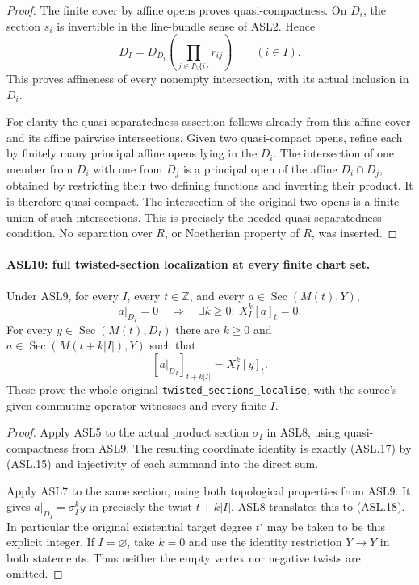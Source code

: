 \documentclass[11pt,a4paper]{article}
\numberwithin{equation}{section}
\theoremstyle{remark}\newtheorem{remark}[theorem]{Remark}
\begin{document}
\begin{proof}
The finite cover by affine opens proves quasi-compactness.
On $D_i$, the section $s_i$ is invertible in the line-bundle
sense of ASL2.  Hence
\[
 D_I=D_{D_i}\left(\prod_{j\in I\setminus\{i\}}r_{ij}\right)
                       \qquad(i\in I).                \tag{ASL.16}
\]
This proves affineness of every nonempty intersection, with its
actual inclusion in $D_i$.

For clarity the quasi-separatedness assertion follows already
from this affine cover and its affine pairwise intersections.
Given two quasi-compact opens, refine each by finitely many
principal affine opens lying in the $D_i$.  The intersection of
one member from $D_i$ with one from $D_j$ is a principal open
of the affine $D_i\cap D_j$, obtained by restricting their two
defining functions and inverting their product.  It is therefore
quasi-compact.  The intersection of the original two opens is a
finite union of such intersections.  This is precisely the needed
quasi-separatedness condition.  No separation over $R$, or
Noetherian property of $R$, was inserted.
\end{proof}

\paragraph{ASL10: full twisted-section localization at every finite chart set.}
\label{claim:ASL10}
Under ASL9, for every $I$, every $t\in\mathbb Z$, and every
$a\in\operatorname{Sec}(M(t),Y)$,
\[
 a|_{D_I}=0\quad\Longrightarrow\quad
       \exists k\ge0:\ X_I^k[a]_t=0.                 \tag{ASL.17}
\]
For every $y\in\operatorname{Sec}(M(t),D_I)$ there are
$k\ge0$ and $a\in\operatorname{Sec}(M(t+k|I|),Y)$ such that
\[
             [a|_{D_I}]_{t+k|I|}=X_I^k[y]_t.         \tag{ASL.18}
\]
These prove the whole original
\texttt{twisted\_\allowbreak{}sections\_\allowbreak{}localise}, with the source's given
commuting-operator witnesses and every finite $I$.

\begin{proof}
Apply ASL5 to the actual product section $\sigma_I$ in ASL8,
using quasi-compactness from ASL9.  The resulting coordinate
identity is exactly (ASL.17) by (ASL.15) and injectivity of each
summand into the direct sum.

Apply ASL7 to the same section, using both topological properties
from ASL9.  It gives $a|_{D_I}=\sigma_I^ky$ in precisely the
twist $t+k|I|$.  ASL8 translates this to (ASL.18).  In
particular the original existential target degree $t'$ may be
taken to be this explicit integer.  If $I=\varnothing$, take
$k=0$ and use the identity restriction $Y\to Y$ in both statements.
Thus neither the empty vertex nor negative twists are omitted.
\end{proof}
\end{document}

